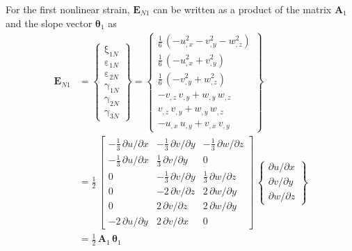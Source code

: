 For the first nonlinear strain, $\mathbf{E}_{N1}$ can be written as a product of the matrix $\mathbf{A}_1$ and the slope vector $\boldsymbol{\theta}_1$ as
\begin{equation}
\begin{aligned}
\mathbf{E}_{N1} & =  \begin{Bmatrix}
\mathrm \xi_{1N} \\
\mathrm \varepsilon_{1N} \\
\mathrm \varepsilon_{2N} \\
\mathrm \gamma_{1N} \\
\mathrm \gamma_{2N} \\
\mathrm \gamma_{3N} \end{Bmatrix} =
\begin{Bmatrix}
\tfrac{1}{6} \,  \left( -u_{,x}^2 - v_{,y}^2  -  w_{,z}^2  \right)\\
\tfrac{1}{6} \,  \left( -u_{,x}^2 +  v_{,y}^2 \right) \\
\tfrac{1}{6} \,  \left( - v_{,y}^2 + w_{,z}^2 \right) \\ 
 -v_{,z} \, v_{,y} + w_{,y} \, w_{,z} \\
 v_{,z} \, v_{,y} + w_{,y} \, w_{,z}\\ 
- u_{,x} \, u_{,y} + v_{,x} \, v_{,y}\end{Bmatrix} \\
& = \frac{1}{2} \, \begin{bmatrix}
-\tfrac{1}{3} \, \partial u / \partial x &  - \tfrac{1}{3} \, \partial v / \partial y & -\tfrac{1}{3} \, \partial w / \partial z  \\
-\tfrac{1}{3} \, \partial u / \partial x &  \tfrac{1}{3} \, \partial v / \partial y & 0  \\
0  & -\tfrac{1}{3} \, \partial v / \partial y & \tfrac{1}{3} \, \partial w / \partial z \\
0 &  - 2 \, \partial v / \partial z &  2 \,  \partial w / \partial y  \\
0 &  2 \, \partial v / \partial z  & 2 \,  \partial w / \partial y  \\
- 2 \, \partial u / \partial y &   2 \, \partial v / \partial x & 0   \end{bmatrix} \, \begin{Bmatrix}
\partial u / \partial x\\
\partial v / \partial y \\
\partial w / \partial z
\end{Bmatrix} \\
& = \tfrac{1}{2} \, \mathbf{A}_1 \, \boldsymbol{\theta}_1
\end{aligned}
\end{equation}
